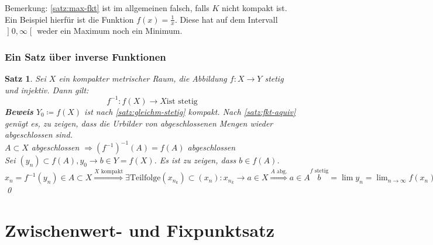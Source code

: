\documentclass[ngerman,titlepage,twoside, parskip=half*]{scrreprt}
\theoremstyle{plain}
\newtheorem{theorem}{Satz}[section]
\theoremstyle{definition}
\theoremstyle{remark}
\newcommand*{\bsofint}[1]{\mathopen{]}#1\mathclose{[}} %
\begin{document}
Bemerkung: \autoref{satz:max-fkt} ist im allgemeinen falsch, falls $K$ nicht kompakt ist. Ein Beispiel hierfür ist
die Funktion $f(x)=\frac{1}{x}$. Diese hat auf dem Intervall $\bsofint{0,\infty}$ weder ein Maximum noch ein Minimum.

\subsubsection{Ein Satz über inverse Funktionen}
\begin{theorem}
\label{satz:invFunkt}
Sei $X$ ein kompakter metrischer Raum, die Abbildung $f\colon X\rightarrow Y$ stetig und injektiv. Dann gilt:
\[f^{-1}\colon f(X)\rightarrow X\text{ist stetig}\]
\textbf{Beweis} $Y_0 \coloneqq f(X)$ ist nach \autoref{satz:gleichm-stetig} kompakt. Nach \autoref{satz:fkt-aquiv} genügt es,
zu zeigen, dass die Urbilder von abgeschlossenen Mengen wieder abgeschlossen sind.\\
$A\subset X$ abgeschlossen $\Rightarrow (f^{-1})^{-1}(A)=f(A)$ abgeschlossen\\
Sei $(y_n)\subset f(A), y_0\rightarrow b\in Y=f(X)$. Es ist zu zeigen, dass $b\in f(A)$.\\
$x_n=f^{-1}(y_n)\in A\subset X\stackrel{X\text{~kompakt}}{\Rightarrow} \exists \text{Teilfolge}(x_{n_k})\subset (x_n)
\colon x_{n_k}\rightarrow a\in X\stackrel{A\text{~abg.}}{\Rightarrow} a\in A\stackrel{f\text{~stetig}} b=\lim y_n=
\lim_{n\rightarrow\infty}f(x_n)=\lim_{k\rightarrow\infty}f(x_{n_k})=f(a)\in f(A)$
\qed
\end{theorem}

\section{Zwischenwert- und Fixpunktsatz}
\end{document}
